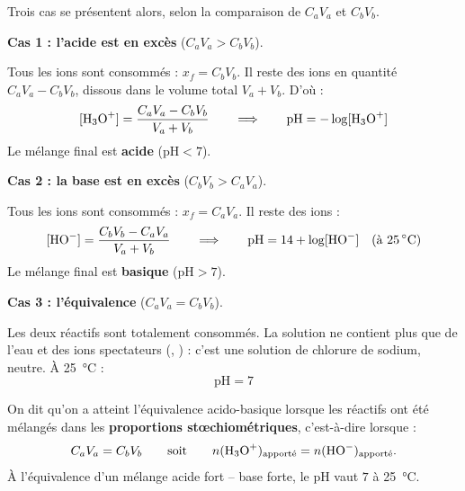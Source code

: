 \documentclass[11pt]{article}
\newcommand{\cle}[1]{{\popxbold\color{popdark}#1}}
\begin{document}
Trois cas se présentent alors, selon la comparaison de $C_a V_a$ et $C_b V_b$.

\textbf{Cas 1 : l'acide est en excès} ($C_a V_a > C_b V_b$).

Tous les ions  sont consommés : $x_f = C_b V_b$. Il reste des ions  en quantité $C_a V_a - C_b V_b$, dissous dans le volume total $V_a + V_b$. D'où :
\[ [\ce{H3O+}] = \frac{C_a V_a - C_b V_b}{V_a + V_b} \qquad \Longrightarrow \qquad \mathrm{pH} = -\log[\ce{H3O+}] \]
Le mélange final est \textbf{acide} ($\mathrm{pH} < 7$).

\textbf{Cas 2 : la base est en excès} ($C_b V_b > C_a V_a$).

Tous les ions  sont consommés : $x_f = C_a V_a$. Il reste des ions  :
\[ [\ce{HO-}] = \frac{C_b V_b - C_a V_a}{V_a + V_b} \qquad \Longrightarrow \qquad \mathrm{pH} = 14 + \log[\ce{HO-}] \quad (\text{à } \SI{25}{\celsius}) \]
Le mélange final est \textbf{basique} ($\mathrm{pH} > 7$).

\textbf{Cas 3 : l'équivalence} ($C_a V_a = C_b V_b$).

Les deux réactifs sont totalement consommés. La solution ne contient plus que de l'eau et des ions spectateurs (, ) : c'est une solution de chlorure de sodium, neutre. À \SI{25}{\celsius} :
\[ \boxed{\mathrm{pH} = 7} \]

\begin{definition}
On dit qu'on a atteint l'\cle{équivalence acido-basique} lorsque les réactifs ont été mélangés dans les \textbf{proportions stœchiométriques}, c'est-à-dire lorsque :
\[ C_a V_a = C_b V_b \qquad \text{soit} \qquad n(\ce{H3O+})_{\text{apporté}} = n(\ce{HO-})_{\text{apporté}}. \]
À l'équivalence d'un mélange acide fort -- base forte, le pH vaut $7$ à \SI{25}{\celsius}.
\end{definition}
\end{document}
